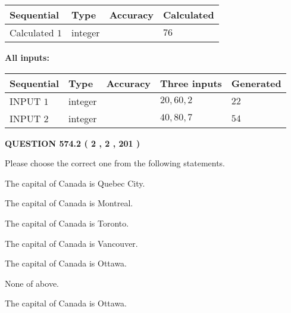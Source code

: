 \documentclass[12pt]{article}
\begin{document}
   
  
  
\noindent\begin{tabular}{|l|l|l|l|}
\hline
 Sequential & Type & Accuracy & Calculated \\ 
\hline
 
 
  Calculated $  1 $ & integer &  & 
  $ 76 $ 
 \\  \hline  
 \end{tabular}
   
   
   
   
\noindent\vspace{0.1in}\hspace{-0.08in} {\textbf{\Large{All inputs: }}}
   
   
  
  
\noindent\begin{tabular}{|l|l|l|l|l|}
\hline
 Sequential & Type & Accuracy & Three inputs & Generated \\ 
\hline
 
 
  INPUT $  1 $ & integer &  & $
 20
 , 
 60
 , 
 2
 $ & $ 22 $ 
 \\  \hline  
 
 
  INPUT $  2 $ & integer &  & $
 40
 , 
 80
 , 
 7
 $ & $ 54 $ 
 \\  \hline  
 \end{tabular}
   
   
  
\vspace{0.2in}
  
{\textbf{\Large{QUESTION
574.2 
 ( 2 , 2 , 201 )
}}}
  
  
Please choose the correct one from the following statements.
 
 
The capital of Canada is Quebec City.
 
 
The capital of Canada is Montreal.
 
 
The capital of Canada is Toronto.
 
 
The capital of Canada is Vancouver.
 
 
The capital of Canada is Ottawa.
 
 
 None of above.
 
 
\noindent{}
 
 
The capital of Canada is Ottawa.
 
\end{document}
